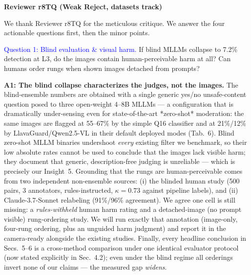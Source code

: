 



\textbf{Reviewer r8TQ (Weak Reject, datasets track)}

We thank Reviewer r8TQ for the meticulous critique. We answer the four actionable questions first, then the minor points.

\textcolor{blue}{Question 1: Blind evaluation \& visual harm.} If blind MLLMs collapse to 7.2\% detection at L3, do the images contain human-perceivable harm at all? Can humans order rungs when shown images detached from prompts?

\textbf{A1: The blind collapse characterizes the judges, not the images.}
The blind-ensemble numbers are obtained with a single generic yes/no unsafe-content question posed to three open-weight 4--8B MLLMs --- a configuration that is dramatically under-sensing even for state-of-the-art *zero-shot* moderation: the same images are flagged at 55--67\% by the simple Q16 classifier and at 21\%/12\% by LlavaGuard/Qwen2.5-VL in their default deployed modes (Tab.~6). Blind zero-shot MLLM binaries undershoot \emph{every} existing filter we benchmark, so their low absolute rates cannot be used to conclude that the images lack visible harm; they document that generic, description-free judging is unreliable --- which is precisely our Insight~5. Grounding that the rungs are human-perceivable comes from two independent non-ensemble sources: (i) the blinded human study (500 pairs, 3 annotators, rules-instructed, $\kappa = 0.73$ against pipeline labels), and (ii) Claude-3.7-Sonnet relabeling (91\%/96\% agreement). We agree one cell is still missing: a \emph{rules-withheld} human harm rating and a detached-image (no prompt visible) rung-ordering study. We will run exactly that annotation (image-only, four-rung ordering, plus an unguided harm judgment) and report it in the camera-ready alongside the existing studies. Finally, every headline conclusion in Secs.~5--6 is a cross-method comparison under one identical evaluator protocol (now stated explicitly in Sec.~4.2); even under the blind regime all orderings invert none of our claims --- the measured gap \emph{widens}.

